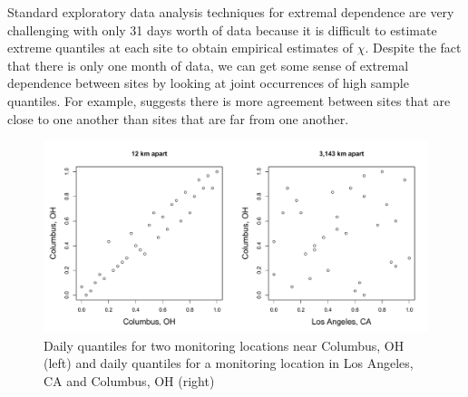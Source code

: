 \documentclass[useAMS,usenatbib,referee]{biom}
\begin{document}
Standard exploratory data analysis techniques for extremal dependence are very challenging with only 31 days worth of data because it is difficult to estimate extreme quantiles at each site to obtain empirical estimates of $\chi$.
Despite the fact that there is only one month of data, we can get some sense of extremal dependence between sites by looking at joint occurrences of high sample quantiles.
For example,  suggests there is more agreement between sites that are close to one another than sites that are far from one another.
\begin{figure}
  \centering
  \includegraphics[width=\linewidth]{plots/daily-quantiles-ozone.pdf}
  \caption{Daily quantiles for two monitoring locations near Columbus, OH (left) and daily quantiles for a monitoring location in Los Angeles, CA and Columbus, OH (right)}
  \label{stfig:bivariateozone}
\end{figure}

\end{document}
